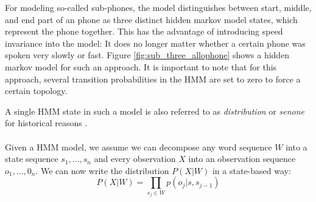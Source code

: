 For modeling so-called sub-phones, the model distinguishes between start, middle, and end part of an phone as three distinct hidden markov model states, which represent the phone together. This has the advantage of introducing speed invariance into the model: It does no longer matter whether a certain phone was spoken very slowly or fast. Figure \ref{fig:sub_three_allophone} shows a hidden markov model for such an approach. It is important to note that for this approach, several transition probabilities in the HMM are set to zero to force a certain topology. \\
\begin{minipage}{\linewidth}
	\label{fig:sub_three_allophone}
	\hspace{1cm}
\end{minipage}
A single HMM state in such a model is also referred to as \textit{distribution} or \textit{senone} for historical reasons \cite{yu2016automatic}. \\ \\
Given a HMM model, we assume we can decompose any word sequence $W$ into a state sequence $s_1,...,s_n$ and every observation $X$ into an observation sequence $o_1,...,0_n$. We can now write the distribution $P(X|W)$ in a state-based way:
\[
P(X|W) = \prod_{s_j \in W} p(o_j | s, s_{j - 1})
\]
